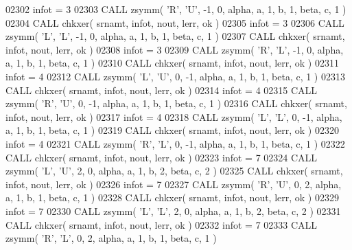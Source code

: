 \begin{DoxyCode}
02302       infot = 3
02303       \textcolor{keyword}{CALL }zsymm( \textcolor{stringliteral}{'R'}, \textcolor{stringliteral}{'U'}, -1, 0, alpha, a, 1, b, 1, beta, c, 1 )
02304       \textcolor{keyword}{CALL }chkxer( srnamt, infot, nout, lerr, ok )
02305       infot = 3
02306       \textcolor{keyword}{CALL }zsymm( \textcolor{stringliteral}{'L'}, \textcolor{stringliteral}{'L'}, -1, 0, alpha, a, 1, b, 1, beta, c, 1 )
02307       \textcolor{keyword}{CALL }chkxer( srnamt, infot, nout, lerr, ok )
02308       infot = 3
02309       \textcolor{keyword}{CALL }zsymm( \textcolor{stringliteral}{'R'}, \textcolor{stringliteral}{'L'}, -1, 0, alpha, a, 1, b, 1, beta, c, 1 )
02310       \textcolor{keyword}{CALL }chkxer( srnamt, infot, nout, lerr, ok )
02311       infot = 4
02312       \textcolor{keyword}{CALL }zsymm( \textcolor{stringliteral}{'L'}, \textcolor{stringliteral}{'U'}, 0, -1, alpha, a, 1, b, 1, beta, c, 1 )
02313       \textcolor{keyword}{CALL }chkxer( srnamt, infot, nout, lerr, ok )
02314       infot = 4
02315       \textcolor{keyword}{CALL }zsymm( \textcolor{stringliteral}{'R'}, \textcolor{stringliteral}{'U'}, 0, -1, alpha, a, 1, b, 1, beta, c, 1 )
02316       \textcolor{keyword}{CALL }chkxer( srnamt, infot, nout, lerr, ok )
02317       infot = 4
02318       \textcolor{keyword}{CALL }zsymm( \textcolor{stringliteral}{'L'}, \textcolor{stringliteral}{'L'}, 0, -1, alpha, a, 1, b, 1, beta, c, 1 )
02319       \textcolor{keyword}{CALL }chkxer( srnamt, infot, nout, lerr, ok )
02320       infot = 4
02321       \textcolor{keyword}{CALL }zsymm( \textcolor{stringliteral}{'R'}, \textcolor{stringliteral}{'L'}, 0, -1, alpha, a, 1, b, 1, beta, c, 1 )
02322       \textcolor{keyword}{CALL }chkxer( srnamt, infot, nout, lerr, ok )
02323       infot = 7
02324       \textcolor{keyword}{CALL }zsymm( \textcolor{stringliteral}{'L'}, \textcolor{stringliteral}{'U'}, 2, 0, alpha, a, 1, b, 2, beta, c, 2 )
02325       \textcolor{keyword}{CALL }chkxer( srnamt, infot, nout, lerr, ok )
02326       infot = 7
02327       \textcolor{keyword}{CALL }zsymm( \textcolor{stringliteral}{'R'}, \textcolor{stringliteral}{'U'}, 0, 2, alpha, a, 1, b, 1, beta, c, 1 )
02328       \textcolor{keyword}{CALL }chkxer( srnamt, infot, nout, lerr, ok )
02329       infot = 7
02330       \textcolor{keyword}{CALL }zsymm( \textcolor{stringliteral}{'L'}, \textcolor{stringliteral}{'L'}, 2, 0, alpha, a, 1, b, 2, beta, c, 2 )
02331       \textcolor{keyword}{CALL }chkxer( srnamt, infot, nout, lerr, ok )
02332       infot = 7
02333       \textcolor{keyword}{CALL }zsymm( \textcolor{stringliteral}{'R'}, \textcolor{stringliteral}{'L'}, 0, 2, alpha, a, 1, b, 1, beta, c, 1 )

\end{DoxyCode}
